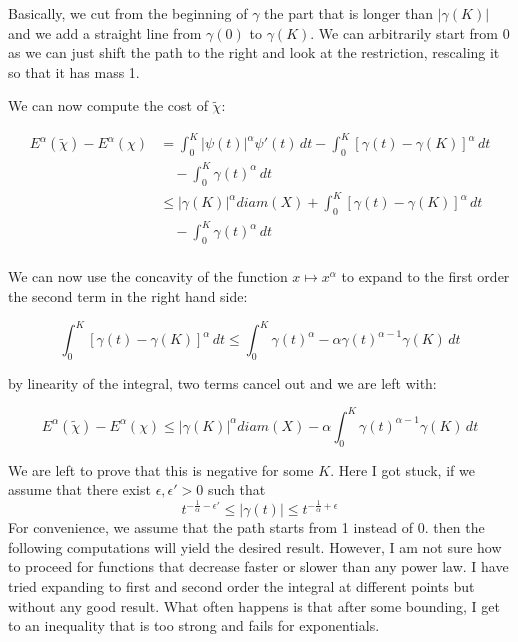 \documentclass[12pt,a4paper]{article}
\numberwithin{equation}{section}
\theoremstyle{mytheorem}
\theoremstyle{myremark}
\theoremstyle{myparagraph}
\begin{document}
    Basically, we cut from the beginning of $\gamma$ the part that is longer than $|\gamma(K)|$ and we add a straight line from
    $\gamma(0)$ to $\gamma(K)$. We can arbitrarily start from 0 as we can just shift the path to the right and look at the restriction,
    rescaling it so that it has mass 1.

    We can now compute the cost of $\tilde{\chi}$:

    \begin{align*}
        E^\alpha(\tilde{\chi}) - E^\alpha(\chi) &= \int_0^K |\psi(t)|^\alpha \psi'(t) \, dt - \int_0^K \left[\gamma(t) - \gamma(K)\right]^\alpha \, dt \\
        &\quad - \int_0^K \gamma(t)^\alpha \, dt \\
        &\le |\gamma(K)|^\alpha diam(X) +  \int_0^K \left[\gamma(t) - \gamma(K)\right]^\alpha \, dt \\
        &\quad - \int_0^K \gamma(t)^\alpha \, dt \\
    \end{align*}

    We can now use the concavity of the function $x \mapsto x^\alpha$ to expand to the first order the second term in the right hand side:

    \begin{equation}
        \int_0^K \left[\gamma(t) - \gamma(K)\right]^\alpha \, dt \le \int_0^K \gamma(t)^\alpha - \alpha \gamma(t)^{\alpha - 1} \gamma(K) \, dt
    \end{equation}

    by linearity of the integral, two terms cancel out and we are left with:

    \begin{equation}
        E^\alpha(\tilde{\chi}) - E^\alpha(\chi) \le |\gamma(K)|^\alpha diam(X) - \alpha \int_0^K \gamma(t)^{\alpha - 1} \gamma(K) \, dt
    \end{equation}

    We are left to prove that this is negative for some $K$. Here I got stuck, if we assume that there exist $\epsilon,\epsilon' > 0$ such that
    $$t^{-\frac{1}{\alpha} - \epsilon'} \le |\gamma(t)| \le t^{-\frac{1}{\alpha} + \epsilon}$$
    For convenience, we assume that the path starts from 1 instead of 0.
    then the following computations will yield the desired result. However, I am not sure how to proceed for functions that decrease faster or slower than any power law.
    I have tried expanding to first and second order the integral at different points but without any good result. What often happens is that
    after some bounding, I get to an inequality that is too strong and fails for exponentials.
\end{document}
